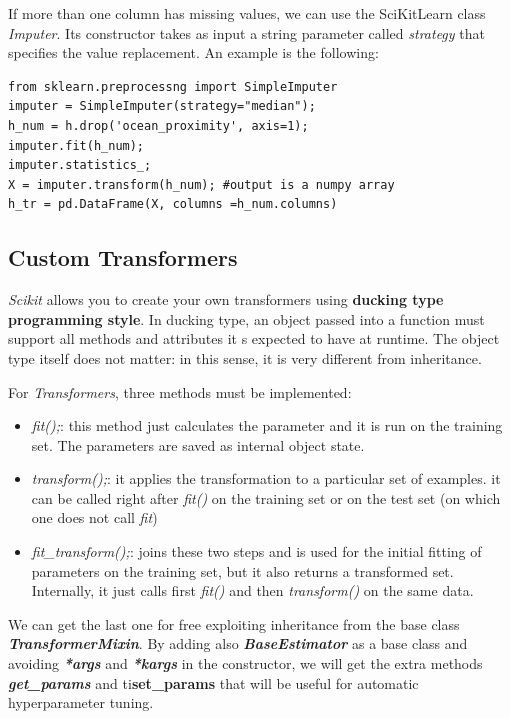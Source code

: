 \documentclass[12pt, letterpaper]{article}
\theoremstyle{definition}
\let\ti\textit
\let\tb\textbf
\begin{document}
If more than one column has missing values, we can use the SciKitLearn class \ti{Imputer}. Its constructor takes as input a string parameter called \ti{strategy} that specifies the value replacement. An example is the following:
\begin{lstlisting}[caption=Usage of \ti{SimpleImputer to clean data}]
from sklearn.preprocessng import SimpleImputer
imputer = SimpleImputer(strategy="median");
h_num = h.drop('ocean_proximity', axis=1);
imputer.fit(h_num);
imputer.statistics_;
X = imputer.transform(h_num); #output is a numpy array
h_tr = pd.DataFrame(X, columns =h_num.columns)
\end{lstlisting}

\subsection{Custom Transformers}
\ti{Scikit} allows you to create your own transformers using \tb{ducking type programming style}. In ducking type, an object passed into a function must support all methods and attributes it s expected to have at runtime. The object type itself does not matter: in this sense, it is very different from inheritance. 

For \ti{Transformers}, three methods must be implemented:
\begin{itemize}
\item\ti{fit();}: this method just calculates the parameter and it is run on the training set. The parameters are saved as internal object state.
\item \ti{transform();}: it applies the transformation to a particular set of examples. it can be called right after \ti{fit()} on the training set or on the test set (on which one does not call \ti{fit})
\item \ti{fit\_transform();}: joins these two steps and is used for the initial fitting of parameters on the training set, but it also returns a transformed set. Internally, it just calls first \ti{fit()} and then \ti{transform()} on the same data.
\end{itemize}
We can get the last one for free exploiting inheritance from the base class \ti{\tb{TransformerMixin}}. By adding also \ti{\tb{BaseEstimator}} as a base class and avoiding \ti\tb{*args} and \ti\tb{*kargs} in the constructor, we will get the extra methods \ti\tb{get\_params} and ti\tb{set\_params} that will be useful for automatic hyperparameter tuning.
\end{document}
